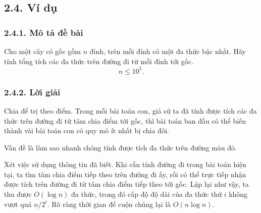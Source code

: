 \documentclass[11pt]{article}
\begin{document}
\subsection*{2.4. Ví dụ}

\subsubsection*{2.4.1. Mô tả đề bài}

Cho một cây có gốc gồm \(n\) đỉnh, trên mỗi đỉnh có một đa thức bậc nhất. Hãy
tính tổng tích các đa thức trên đường đi từ mỗi đỉnh tới gốc.
\[
  n\le10^5.
\]

\subsubsection*{2.4.2. Lời giải}

Chia để trị theo điểm. Trong mỗi bài toán con, giả sử ta đã tính được tích các
đa thức trên đường đi từ tâm chia điểm tới gốc, thì bài toán ban đầu có thể
biến thành vài bài toán con có quy mô ít nhất bị chia đôi.

\begin{center}
\end{center}

Vấn đề là làm sao nhanh chóng tính được tích đa thức trên đường màu đỏ.

Xét việc sử dụng thông tin đã biết. Khi cần tính đường đi trong bài toán hiện
tại, ta tìm tâm chia điểm tiếp theo trên đường đi ấy, rồi có thể trực tiếp
nhận được tích trên đường đi từ tâm chia điểm tiếp theo tới gốc. Lặp lại như
vậy, ta thu được \(O(\log n)\) đa thức, trong đó cấp độ độ dài của đa thức thứ
\(i\) không vượt quá \(n/2^i\). Rõ ràng thời gian để cuộn chúng lại là
\(O(n\log n)\).
\end{document}
